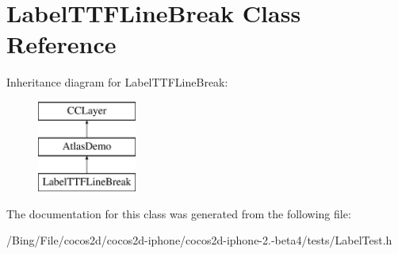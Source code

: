 \hypertarget{interface_label_t_t_f_line_break}{\section{Label\-T\-T\-F\-Line\-Break Class Reference}
\label{interface_label_t_t_f_line_break}
}
Inheritance diagram for Label\-T\-T\-F\-Line\-Break\-:\begin{figure}[H]
\begin{center}
\leavevmode
\includegraphics[height=3.000000cm]{interface_label_t_t_f_line_break}
\end{center}
\end{figure}


The documentation for this class was generated from the following file\-:\begin{DoxyCompactItemize}
\item 
/\-Bing/\-File/cocos2d/cocos2d-\/iphone/cocos2d-\/iphone-\/2.-\/beta4/tests/Label\-Test.\-h\end{DoxyCompactItemize}
